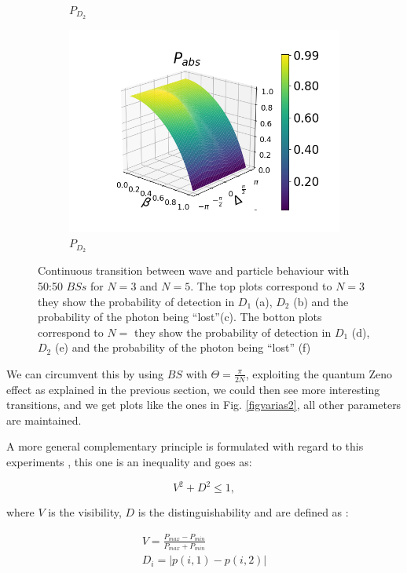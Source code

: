 \documentclass[12pt]{book}
\begin{document}
\begin{figure}[H]
\begin{subfigure}[b]{0.3\linewidth}
\caption{$P_{D_{2}}$ }
\label{fig:BS1}
\end{subfigure}
\begin{subfigure}[b]{0.3\linewidth}
\includegraphics[width=\linewidth]{images/pabs_5_pi4.png}
\caption{$P_{D_{2}}$ }
\label{fig:BS1}
\end{subfigure}
\caption{Continuous transition between wave and particle behaviour with 50:50 $BSs$ for $N=3$ and $N=5$. The top plots correspond to $N=3$ they show the probability of detection in $D_{1}$ (a), $D_{2}$ (b) and the probability of the photon being ``lost''(c). The botton plots correspond to $N=$ they show the probability of detection in $D_{1}$ (d),  $D_{2}$ (e) and the probability of the photon being ``lost'' (f)}
\label{varias}
\end{figure}


We can circumvent this by using $BS$ with $\Theta=\frac{\pi}{2N}$, exploiting the quantum Zeno effect as explained in the previous section, we could then see more interesting transitions, and we get plots like the ones in Fig. \ref{figvarias2}, all other parameters are maintained.

A more general complementary principle is formulated with regard to this experiments \cite{Ma}, this one is an inequality and goes as:

\begin{equation}
 V^{2} + D^{2} \leq 1,
\end{equation}

where $V$ is the visibility, $D$ is the distinguishability and are defined as :

\begin{align}
 V= \frac{P_{max}-P_{min}}{P_{max}+P_{min}}\\
 D_{i}=|p(i,1)-p(i,2)|
\end{align}
\end{document}
